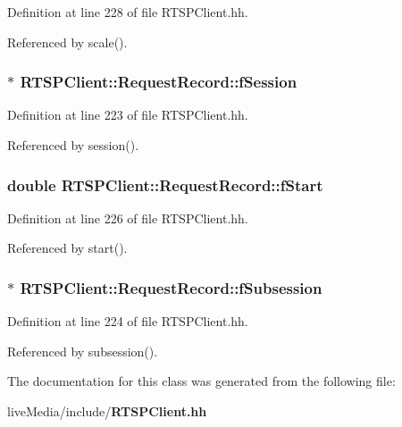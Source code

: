 Definition at line 228 of file R\+T\+S\+P\+Client.\+hh.



Referenced by scale().

\subsubsection[{f\+Session}]{$\ast$ R\+T\+S\+P\+Client\+::\+Request\+Record\+::f\+Session\hspace{0.3cm}{\ttfamily [private]}}\label{classRTSPClient_1_1RequestRecord_a4b85e43e15d2d6e794881120916ba380}


Definition at line 223 of file R\+T\+S\+P\+Client.\+hh.



Referenced by session().

\subsubsection[{f\+Start}]{\setlength{\rightskip}{0pt plus 5cm}double R\+T\+S\+P\+Client\+::\+Request\+Record\+::f\+Start\hspace{0.3cm}{\ttfamily [private]}}\label{classRTSPClient_1_1RequestRecord_a2bbfa566466243644ee0a4fab18b78af}


Definition at line 226 of file R\+T\+S\+P\+Client.\+hh.



Referenced by start().

\subsubsection[{f\+Subsession}]{$\ast$ R\+T\+S\+P\+Client\+::\+Request\+Record\+::f\+Subsession\hspace{0.3cm}{\ttfamily [private]}}\label{classRTSPClient_1_1RequestRecord_a1e6a80cb5e4eb5461cf5e6292a2cc77b}


Definition at line 224 of file R\+T\+S\+P\+Client.\+hh.



Referenced by subsession().



The documentation for this class was generated from the following file\+:\begin{DoxyCompactItemize}
\item 
live\+Media/include/{\bf R\+T\+S\+P\+Client.\+hh}\end{DoxyCompactItemize}
